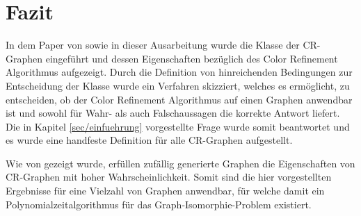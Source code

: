 \section{Fazit}
\label{sec/fazit}

In dem Paper von \cite{Arvind2015} sowie in dieser Ausarbeitung wurde die Klasse der CR-Graphen eingeführt und dessen Eigenschaften bezüglich des Color Refinement Algorithmus aufgezeigt.
Durch die Definition von hinreichenden Bedingungen zur Entscheidung der Klasse wurde ein Verfahren skizziert, welches es ermöglicht, zu entscheiden, ob der Color Refinement Algorithmus auf einen Graphen anwendbar ist und sowohl für Wahr- als auch Falschaussagen die korrekte Antwort liefert. 
Die in Kapitel \ref{sec/einfuehrung} vorgestellte Frage wurde somit beantwortet und es wurde eine handfeste Definition für alle CR-Graphen aufgestellt.

Wie von \cite{Laszlo1980} gezeigt wurde, erfüllen zufällig generierte Graphen die Eigenschaften von CR-Graphen mit hoher Wahrscheinlichkeit.
Somit sind die hier vorgestellten Ergebnisse für eine Vielzahl von Graphen anwendbar, für welche damit ein Polynomialzeitalgorithmus für das Graph-Isomorphie-Problem existiert.